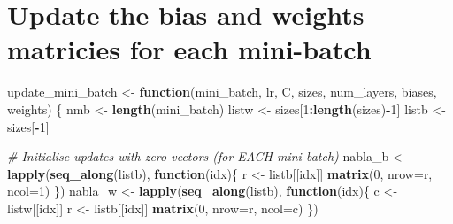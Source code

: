 \documentclass[]{book}
\newenvironment{Shaded}{\begin{snugshade}}{\end{snugshade}}
\newcommand{\CommentTok}[1]{\textcolor[rgb]{0.56,0.35,0.01}{\textit{#1}}}
\newcommand{\ControlFlowTok}[1]{\textcolor[rgb]{0.13,0.29,0.53}{\textbf{#1}}}
\newcommand{\DataTypeTok}[1]{\textcolor[rgb]{0.13,0.29,0.53}{#1}}
\newcommand{\DecValTok}[1]{\textcolor[rgb]{0.00,0.00,0.81}{#1}}
\newcommand{\KeywordTok}[1]{\textcolor[rgb]{0.13,0.29,0.53}{\textbf{#1}}}
\newcommand{\NormalTok}[1]{#1}
\newcommand{\OperatorTok}[1]{\textcolor[rgb]{0.81,0.36,0.00}{\textbf{#1}}}
\newcommand{\StringTok}[1]{\textcolor[rgb]{0.31,0.60,0.02}{#1}}
\begin{document}
\hypertarget{update-the-bias-and-weights-matricies-for-each-mini-batch}{%
\section{Update the bias and weights matricies for each mini-batch}\label{update-the-bias-and-weights-matricies-for-each-mini-batch}}

\begin{Shaded}
\begin{Highlighting}[]
\NormalTok{update_mini_batch <-}\StringTok{ }\ControlFlowTok{function}\NormalTok{(mini_batch, lr, C, sizes, num_layers, biases, weights)}
\NormalTok{\{}
\NormalTok{  nmb <-}\StringTok{ }\KeywordTok{length}\NormalTok{(mini_batch)}
\NormalTok{  listw <-}\StringTok{ }\NormalTok{sizes[}\DecValTok{1}\OperatorTok{:}\KeywordTok{length}\NormalTok{(sizes)}\OperatorTok{-}\DecValTok{1}\NormalTok{] }
\NormalTok{  listb <-}\StringTok{  }\NormalTok{sizes[}\OperatorTok{-}\DecValTok{1}\NormalTok{]  }
  
  \CommentTok{# Initialise updates with zero vectors (for EACH mini-batch)}
\NormalTok{  nabla_b <-}\StringTok{ }\KeywordTok{lapply}\NormalTok{(}\KeywordTok{seq_along}\NormalTok{(listb), }\ControlFlowTok{function}\NormalTok{(idx)\{}
\NormalTok{    r <-}\StringTok{ }\NormalTok{listb[[idx]]}
    \KeywordTok{matrix}\NormalTok{(}\DecValTok{0}\NormalTok{, }\DataTypeTok{nrow=}\NormalTok{r, }\DataTypeTok{ncol=}\DecValTok{1}\NormalTok{)}
\NormalTok{  \})}
\NormalTok{  nabla_w <-}\StringTok{ }\KeywordTok{lapply}\NormalTok{(}\KeywordTok{seq_along}\NormalTok{(listb), }\ControlFlowTok{function}\NormalTok{(idx)\{}
\NormalTok{    c <-}\StringTok{ }\NormalTok{listw[[idx]]}
\NormalTok{    r <-}\StringTok{ }\NormalTok{listb[[idx]]}
    \KeywordTok{matrix}\NormalTok{(}\DecValTok{0}\NormalTok{, }\DataTypeTok{nrow=}\NormalTok{r, }\DataTypeTok{ncol=}\NormalTok{c)}
\NormalTok{  \})  }
  

\end{Highlighting}
\end{Shaded}
\end{document}
